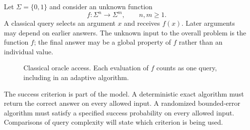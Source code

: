 \documentclass[11pt,oneside,openany]{book}
\theoremstyle{definition}
\begin{document}
Let $\Sigma=\{0,1\}$ and consider an unknown function
\begin{equation}
 f:\Sigma^n\longrightarrow\Sigma^m,\qquad n,m\geq1.
\end{equation}
A classical query selects an argument $x$ and receives $f(x)$. Later arguments may depend on earlier answers. The unknown input to the overall problem is the function $f$; the final answer may be a global property of $f$ rather than an individual value.
\par
\begin{figure}[htbp]
\centering
{}
\caption{Classical oracle access. Each evaluation of $f$ counts as one query, including in an adaptive algorithm.}
\label{fig:oracle-model}
\end{figure}
\par
\FloatBarrier
The success criterion is part of the model. A deterministic exact algorithm must return the correct answer on every allowed input. A randomized bounded-error algorithm must satisfy a specified success probability on every allowed input. Comparisons of query complexity will state which criterion is being used.
\end{document}
